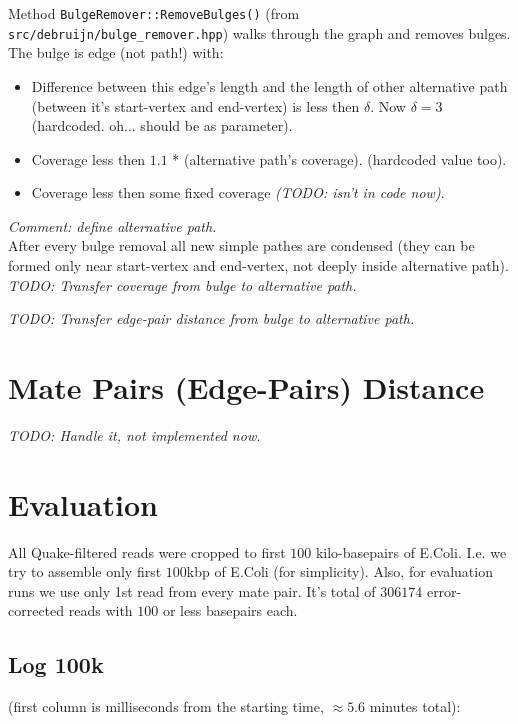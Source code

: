 \documentclass[14pt]{article}
\begin{document}
Method \texttt{BulgeRemover::RemoveBulges()} (from \texttt{src/debruijn/bulge\_remover.hpp}) walks through the graph and removes bulges. The bulge is edge (not path!) with:
\begin{itemize}
\item Difference between this edge's length and the length of other alternative path (between it's start-vertex and end-vertex) is less then $\delta$. Now $\delta = 3$ (hardcoded. oh... should be as parameter).
\item Coverage less then $1.1$ * (alternative path's coverage). (hardcoded value too).
\item Coverage less then some fixed coverage \textit{(TODO: isn't in code now)}.
\end{itemize} \vspace{0.5 cm}

\textit{Comment: define alternative path.} \\

After every bulge removal all new simple pathes are condensed (they can be formed only near start-vertex and end-vertex, not deeply inside alternative path). \\

\textit{TODO: Transfer coverage from bulge to alternative path.}

\textit{TODO: Transfer edge-pair distance from bulge to alternative path.}

\section{Mate Pairs (Edge-Pairs) Distance}

\textit{TODO: Handle it, not implemented now.}

\section{Evaluation}

All Quake-filtered reads were cropped to first $100$ kilo-basepairs of E.Coli. I.e. we try to assemble only first $100$kbp of E.Coli (for simplicity). Also, for evaluation runs we use only 1st read from every mate pair. It's total of $306174$ error-corrected reads with $100$ or less basepairs each.

\subsection{Log 100k}
(first column is milliseconds from the starting time, $\approx 5.6$ minutes total): \\
\end{document}
